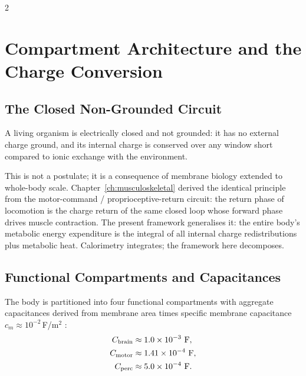 \begin{multicols}{2}

\section{Compartment Architecture and the Charge Conversion}
\label{sec:ch08-compartments}

\subsection{The Closed Non-Grounded Circuit}

\begin{definition}
\label{def:ch08-closed}
A living organism is electrically closed and not grounded: it has no external charge ground, and its internal charge is conserved over any window short compared to ionic exchange with the environment.
\end{definition}

This is not a postulate; it is a consequence of membrane biology \citep{hodgkin1952} extended to whole-body scale. Chapter~\ref{ch:musculoskeletal} derived the identical principle from the motor-command / proprioceptive-return circuit: the return phase of locomotion is the charge return of the same closed loop whose forward phase drives muscle contraction. The present framework generalises it: the entire body's metabolic energy expenditure is the integral of all internal charge redistributions plus metabolic heat. Calorimetry integrates; the framework here decomposes.

\subsection{Functional Compartments and Capacitances}

The body is partitioned into four functional compartments with aggregate capacitances derived from membrane area times specific membrane capacitance $c_m \approx 10^{-2}$\,F/m$^2$ \citep{cole1941, gentet2000}:
\begin{align}
C_{\mathrm{brain}} &\approx 1.0 \times 10^{-3}~\mathrm{F}, \label{eq:ch08-Cbrain}\\
C_{\mathrm{motor}} &\approx 1.41 \times 10^{-4}~\mathrm{F}, \label{eq:ch08-Cmotor}\\
C_{\mathrm{perc}} &\approx 5.0 \times 10^{-4}~\mathrm{F}. \label{eq:ch08-Cperc}
\end{align}


\end{multicols}

